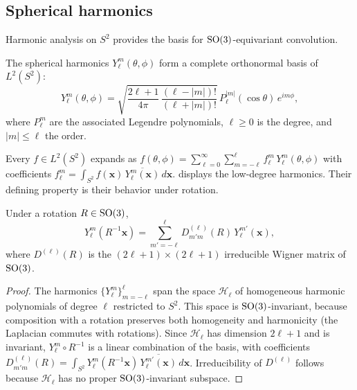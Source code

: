 \subsection{Spherical harmonics}
\label{sec:groups:spherical-harmonics}

Harmonic analysis on $S^2$ provides the basis for $\operatorname{SO}(3)$-equivariant
convolution.

\begin{definition}
\label{def:groups:spherical-harmonics}
The spherical harmonics $Y_\ell^m(\theta, \phi)$ form a complete orthonormal
basis of $L^2(S^2)$:
\begin{equation}
  Y_\ell^m(\theta, \phi) = \sqrt{\frac{2\ell+1}{4\pi}\,
    \frac{(\ell - |m|)!}{(\ell + |m|)!}}\,
    P_\ell^{|m|}(\cos\theta)\, e^{im\phi},
\end{equation}
where $P_\ell^m$ are the associated Legendre polynomials, $\ell \geq 0$ is the
degree, and $|m| \leq \ell$ the order.
\end{definition}

Every $f \in L^2(S^2)$ expands as $f(\theta, \phi) = \sum_{\ell=0}^{\infty}
\sum_{m=-\ell}^{\ell} f_\ell^m\, Y_\ell^m(\theta, \phi)$ with coefficients
$f_\ell^m = \int_{S^2} f(\mathbf{x})\, \overline{Y_\ell^m(\mathbf{x})}\,
d\mathbf{x}$.  displays the low-degree
harmonics. Their defining property is their behavior under rotation.

\begin{theorem}
\label{thm:groups:sh-transformation}
Under a rotation $R \in \operatorname{SO}(3)$,
\begin{equation}
  Y_\ell^m(R^{-1}\mathbf{x}) = \sum_{m'=-\ell}^{\ell} D^{(\ell)}_{m'm}(R)\,
    Y_\ell^{m'}(\mathbf{x}),
\end{equation}
where $D^{(\ell)}(R)$ is the $(2\ell+1)\times(2\ell+1)$ irreducible Wigner matrix
of $\operatorname{SO}(3)$.
\end{theorem}

\begin{proof}
The harmonics $\{Y_\ell^m\}_{m=-\ell}^{\ell}$ span the space $\mathcal{H}_\ell$
of homogeneous harmonic polynomials of degree $\ell$ restricted to $S^2$. This
space is $\operatorname{SO}(3)$-invariant, because composition with a rotation preserves both
homogeneity and harmonicity (the Laplacian commutes with rotations). Since
$\mathcal{H}_\ell$ has dimension $2\ell+1$ and is invariant, $Y_\ell^m \circ
R^{-1}$ is a linear combination of the basis, with coefficients $D^{(\ell)}_{m'm}
(R) = \int_{S^2} Y_\ell^m(R^{-1}\mathbf{x})\, \overline{Y_\ell^{m'}(\mathbf{x})}
\, d\mathbf{x}$. Irreducibility of $D^{(\ell)}$ follows because
$\mathcal{H}_\ell$ has no proper $\operatorname{SO}(3)$-invariant subspace.
\end{proof}

